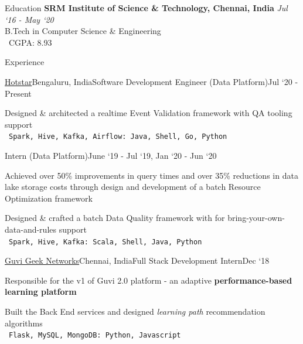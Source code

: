 \documentclass{resume}
\begin{document}
  \begin{rSection}{Education}
    {\bf SRM Institute of Science \& Technology, Chennai, India} \hfill {\em Jul `16 - May `20} \\ 
    { B.Tech in Computer Science \& Engineering } \\
    \textbullet\ CGPA: 8.93
    
  \end{rSection}
  
  \begin{rSection}{Experience}
  
    \begin{rSubsection}{\href{https://tech.hotstar.com/}{Hotstar}}{Bengaluru, India}{Software Development Engineer (Data Platform)}{Jul `20 - Present}
    \item Designed \& architected a realtime Event Validation framework with QA tooling support\\
    \textbullet\ \texttt{Spark, Hive, Kafka, Airflow: Java, Shell, Go, Python}
    \end{rSubsection}
    
    \vspace*{-\baselineskip}

    \begin{rSubsection}{}{}{Intern (Data Platform)}{June `19 - Jul `19, Jan `20 - Jun `20}
    \item Achieved over 50\% improvements in query times and over 35\% reductions in data lake storage costs through design and development of a batch Resource Optimization framework
    \item Designed \& crafted a batch Data Quality framework with for bring-your-own-data-and-rules support\\
    \textbullet\ \texttt{Spark, Hive, Kafka: Scala, Shell, Java, Python}
    \end{rSubsection}

    \begin{rSubsection}{\href{https://www.guvi.in/}{Guvi Geek Networks}}{Chennai, India}{Full Stack Development Intern}{Dec `18}
    \item[] Responsible for the v1 of Guvi 2.0 platform - an adaptive \textbf{performance-based learning platform}
    \item Built the Back End services and designed \textit{learning path} recommendation algorithms\\
    \textbullet\ \texttt{Flask, MySQL, MongoDB: Python, Javascript}
    \end{rSubsection}


\end{rSection}
\end{document}
